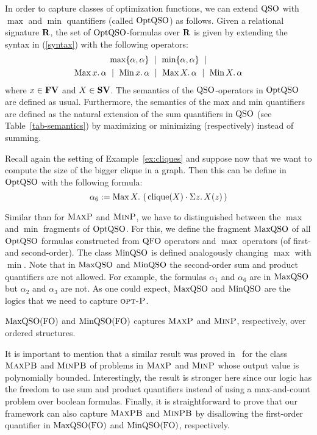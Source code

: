 In order to capture classes of optimization functions, we can extend ${\rm QSO}$ with $\max$ and $\min$ quantifiers (called ${\rm OptQSO}$) as follows. 
Given a relational signature $\mathbf{R}$, the set of ${\rm OptQSO}$-formulas over $\mathbf{R}$ is given by extending the syntax in (\ref{syntax}) with the following operators:
\begin{multline*}
\max\{\alpha,\alpha\} \ \mid\ \min\{\alpha,\alpha\} \ \mid \\ \maxa{x} \alpha \ \mid \ \mina{x} \alpha \ \mid \ \maxa{X} \alpha \ \mid \ \mina{X} \alpha 
\end{multline*}
where $x \in \mathbf{FV}$ and $X \in \mathbf{SV}$. The semantics of the ${\rm QSO}$-operators in ${\rm OptQSO}$ are defined as usual. Furthermore, the semantics of the max and min quantifiers are defined as the natural extension of the sum quantifiers in ${\rm QSO}$ (see Table~\ref{tab-semantics}) by maximizing or minimizing (respectively) instead of summing.
\begin{example}\label{ex:optqso}
	Recall again the setting of Example~\ref{ex:cliques} and suppose now that we want to compute the size of the bigger clique in a graph. Then this can be define in ${\rm OptQSO}$ with the following formula:
	\[
\alpha_6 := \operatorname{Max}{X}.\, \left( \, \operatorname{clique}(X) \cdot \Sigma{z}.\, X(z)  \, \right)
	\]
\end{example}
Similar than for $\text{\sc MaxP}$ and $\text{\sc MinP}$, we have to distinguished between the $\max$ and $\min$ fragments of ${\rm OptQSO}$. For this, we define the fragment ${\rm MaxQSO}$ of all ${\rm OptQSO}$ formulas constructed from ${\rm QFO}$ operators and $\max$ operators (of first- and second-order). The class ${\rm MinQSO}$ is defined analogously changing $\max$ with $\min$. Note that in ${\rm MaxQSO}$ and ${\rm MinQSO}$ the second-order sum and product quantifiers are not allowed. For example, the formulas $\alpha_1$ and $\alpha_6$ are in ${\rm MaxQSO}$ but $\alpha_2$ and $\alpha_3$ are not. As one could expect, ${\rm MaxQSO}$ and ${\rm MinQSO}$ are the logics that we need to capture $\text{\sc opt-P}$.
\begin{theorem} \label{theo:capture-optp}
	${\rm MaxQSO}({\rm FO})$ and ${\rm MinQSO}({\rm FO})$ captures $\text{\sc MaxP}$ and $\text{\sc MinP}$, respectively, over ordered structures.
\end{theorem}
It is important to mention that a similar result was proved in~\cite{kolaitis1994logical} for the class $\text{\sc MaxPB}$ and $\text{\sc MinPB}$ of problems in $\text{\sc MaxP}$ and $\text{\sc MinP}$ whose output value is polynomially bounded.
Interestingly, the result is stronger here since our logic has the freedom to use sum and product quantifiers instead of using a max-and-count problem over boolean formulas. 
Finally, it is straightforward to prove that our framework can also capture $\text{\sc MaxPB}$ and $\text{\sc MinPB}$ by disallowing the first-order quantifier in ${\rm MaxQSO}({\rm FO})$ and ${\rm MinQSO}({\rm FO})$, respectively.

